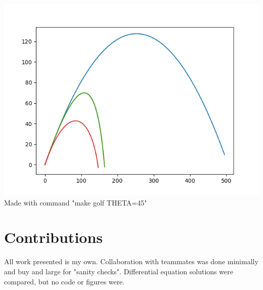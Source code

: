 \documentclass{article}
\begin{document}
\includegraphics[width=.5\textwidth]{golfPlotTheta45.0.png}
Made with command "make golf THETA=45"

\section*{Contributions}

All work presented is my own. Collaboration with teammates was done minimally and buy and large for "sanity checks". Differential equation solutions were compared, but no code or figures were.
\end{document}
